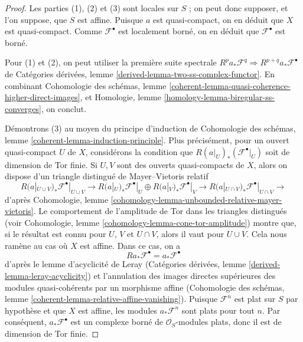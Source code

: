 \begin{proof}
Les parties (1), (2) et (3) sont locales sur $S$ ; on peut donc supposer, et l'on suppose,
que $S$ est affine. Puisque $a$ est quasi-compact, on en déduit que $X$ est quasi-compact.
Comme $\mathcal{F}^\bullet$ est localement borné, on en déduit que
$\mathcal{F}^\bullet$ est borné.

\medskip\noindent
Pour (1) et (2), on peut utiliser la première suite spectrale
$R^pa_*\mathcal{F}^q \Rightarrow R^{p + q}a_*\mathcal{F}^\bullet$ de
Catégories dérivées, lemme \ref{derived-lemma-two-ss-complex-functor}.
En combinant Cohomologie des schémas, lemme
\ref{coherent-lemma-quasi-coherence-higher-direct-images},
et Homologie, lemme \ref{homology-lemma-biregular-ss-converges},
on conclut.

\medskip\noindent
Démontrons (3) au moyen du principe d'induction de
Cohomologie des schémas, lemme \ref{coherent-lemma-induction-principle}.
Plus précisément, pour un ouvert quasi-compact $U$ de $X$, considérons la
condition que $R(a|_U)_*(\mathcal{F}^\bullet|_U)$ soit de
dimension de Tor finie. Si $U, V$ sont des ouverts quasi-compacts de
$X$, alors on dispose d'un triangle distingué de Mayer--Vietoris relatif
$$
R(a|_{U \cup V})_*\mathcal{F}^\bullet|_{U \cup V} \to
R(a|_U)_*\mathcal{F}^\bullet|_U \oplus
R(a|_V)_*\mathcal{F}^\bullet|_V \to
R(a|_{U \cap V})_*\mathcal{F}^\bullet|_{U \cap V} \to
$$
d'après Cohomologie, lemme \ref{cohomology-lemma-unbounded-relative-mayer-vietoris}.
Le comportement de l'amplitude de Tor dans les triangles distingués
(voir Cohomologie, lemme \ref{cohomology-lemma-cone-tor-amplitude})
montre que, si le résultat est connu pour $U$, $V$ et $U \cap V$, alors
il vaut pour $U \cup V$. Cela nous ramène au cas où
$X$ est affine. Dans ce cas, on a
$$
Ra_*\mathcal{F}^\bullet = a_*\mathcal{F}^\bullet
$$
d'après le lemme d'acyclicité de Leray
(Catégories dérivées, lemme \ref{derived-lemma-leray-acyclicity})
et l'annulation des images directes supérieures des modules quasi-cohérents
par un morphisme affine
(Cohomologie des schémas, lemme \ref{coherent-lemma-relative-affine-vanishing}).
Puisque $\mathcal{F}^n$ est plat sur $S$ par hypothèse et que $X$ est affine, les modules
$a_*\mathcal{F}^n$ sont plats pour tout $n$. Par conséquent, $a_*\mathcal{F}^\bullet$
est un complexe borné de $\mathcal{O}_S$-modules plats, donc il est de
dimension de Tor finie.


\end{proof}

